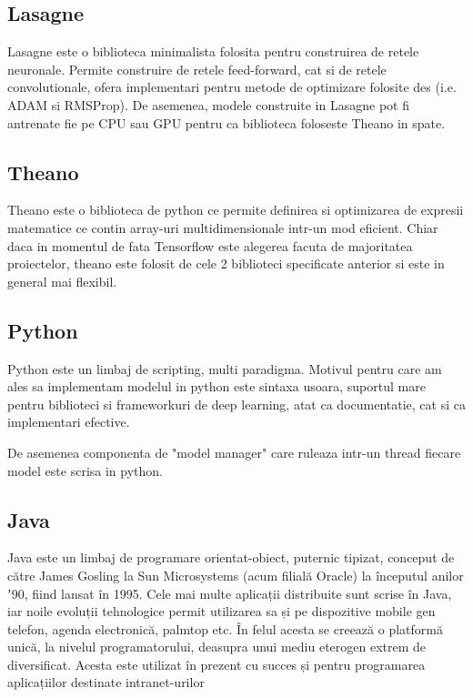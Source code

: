 \documentclass[12pt]{article}
\begin{document}
\subsection{Lasagne}

Lasagne este o biblioteca minimalista folosita pentru construirea de retele neuronale. Permite construire de retele feed-forward, cat si de retele convolutionale, ofera implementari pentru metode de optimizare folosite des (i.e. ADAM si RMSProp). De asemenea, modele construite in Lasagne pot fi antrenate fie pe CPU sau GPU pentru ca biblioteca foloseste Theano in spate.


\subsection{Theano}

Theano este o biblioteca de python ce permite definirea si optimizarea de expresii matematice ce contin array-uri multidimensionale intr-un mod eficient. Chiar daca in momentul de fata Tensorflow este alegerea facuta de majoritatea proiectelor, theano este folosit de cele 2 biblioteci specificate anterior si este in general mai flexibil.

\subsection{Python}

Python este un limbaj de scripting, multi paradigma. Motivul pentru care am ales sa implementam modelul in python este sintaxa usoara, suportul mare pentru biblioteci si frameworkuri de deep learning, atat ca documentatie, cat si ca implementari efective. 

De asemenea componenta de "model manager" care ruleaza intr-un thread fiecare model este scrisa in python.


\subsection{Java}

Java este un limbaj de programare orientat-obiect, puternic tipizat, conceput de către James Gosling la Sun Microsystems (acum filială Oracle) la începutul anilor ʼ90, fiind lansat în 1995. Cele mai multe aplicații distribuite sunt scrise în Java, iar noile evoluții tehnologice permit utilizarea sa și pe dispozitive mobile gen telefon, agenda electronică, palmtop etc. În felul acesta se creează o platformă unică, la nivelul programatorului, deasupra unui mediu eterogen extrem de diversificat. Acesta este utilizat în prezent cu succes și pentru programarea aplicațiilor destinate intranet-urilor
\end{document}
